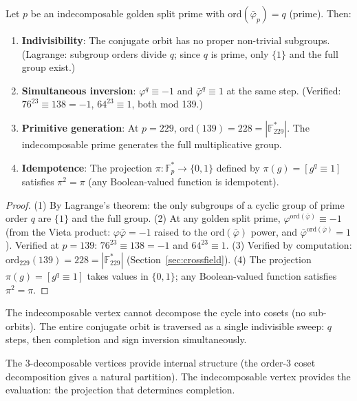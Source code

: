 \begin{theorem}
\label{thm:projection}
Let $p$ be an indecomposable golden split prime with
$\mathrm{ord}(\bar\varphi_p) = q$ (prime). Then:
\begin{enumerate}
  \item \textbf{Indivisibility}: The conjugate orbit has no proper
    non-trivial subgroups. (Lagrange: subgroup orders divide $q$;
    since $q$ is prime, only $\{1\}$ and the full group exist.)
  \item \textbf{Simultaneous inversion}: $\varphi^q \equiv -1$ and
    $\bar\varphi^q \equiv 1$ at the same step.
    (Verified: $76^{23} \equiv 138 = -1$, $64^{23} \equiv 1$, both mod 139.)
  \item \textbf{Primitive generation}: At $p = 229$,
    $\mathrm{ord}(139) = 228 = |\mathbb{F}_{229}^*|$.
    The indecomposable prime generates the full multiplicative group.
  \item \textbf{Idempotence}: The projection
    $\pi: \mathbb{F}_p^* \to \{0, 1\}$ defined by
    $\pi(g) = [g^q \equiv 1]$ satisfies $\pi^2 = \pi$
    (any Boolean-valued function is idempotent).
\end{enumerate}
\end{theorem}

\begin{proof}
(1) By Lagrange's theorem: the only subgroups of a cyclic group of prime order $q$ are $\{1\}$ and the full group.
(2) At any golden split prime, $\varphi^{\mathrm{ord}(\bar{\varphi})} \equiv -1$ (from the Vieta product: $\varphi \bar{\varphi} = -1$ raised to the $\mathrm{ord}(\bar{\varphi})$ power, and $\bar{\varphi}^{\mathrm{ord}(\bar{\varphi})} = 1$). Verified at $p=139$: $76^{23} \equiv 138 = -1$ and $64^{23} \equiv 1$.
(3) Verified by computation: $\mathrm{ord}_{229}(139) = 228 = |\mathbb{F}_{229}^*|$ (Section~\ref{sec:crossfield}).
(4) The projection $\pi(g) = [g^q \equiv 1]$ takes values in $\{0,1\}$; any Boolean-valued function satisfies $\pi^2 = \pi$. \qedhere
\end{proof}

The indecomposable vertex cannot decompose the cycle into cosets
(no sub-orbits). The entire conjugate orbit is traversed as a single
indivisible sweep: $q$ steps, then completion and sign inversion
simultaneously.

The 3-decomposable vertices provide internal structure (the
order-3 coset decomposition gives a natural partition). The
indecomposable vertex provides the evaluation: the projection
that determines completion.

